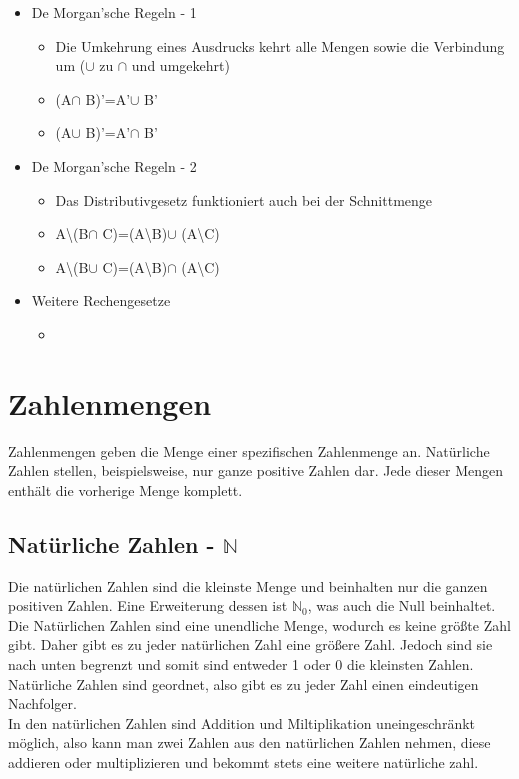 \documentclass{article}
\newcommand{\N}{\mathbb{N}}
\begin{document}
\begin{itemize}
		\item{De Morgan'sche Regeln - 1}
		\begin{itemize}
			\item{Die Umkehrung eines Ausdrucks kehrt alle Mengen sowie die Verbindung um ($\cup$ zu $\cap$ und umgekehrt)}
			\item{(A$\cap$ B)'=A'$\cup$ B'}
			\item{(A$\cup$ B)'=A'$\cap$ B'}
		\end{itemize}
		\item{De Morgan'sche Regeln - 2}
		\begin{itemize}
			\item{Das Distributivgesetz funktioniert auch bei der Schnittmenge}
			\item{A\textbackslash (B$\cap$ C)=(A\textbackslash B)$\cup$ (A\textbackslash C)}
			\item{A\textbackslash (B$\cup$ C)=(A\textbackslash B)$\cap$ (A\textbackslash C)}
		\end{itemize}
		\item{Weitere Rechengesetze}
		\begin{itemize}
			\item{}
		\end{itemize}
	\end{itemize}
	\section{Zahlenmengen}
	Zahlenmengen geben die Menge einer spezifischen Zahlenmenge an. Natürliche Zahlen stellen, beispielsweise, nur ganze positive Zahlen dar. Jede dieser Mengen enthält die vorherige Menge komplett.
	\subsection{Natürliche Zahlen - \texorpdfstring{$\N$}{}}
	Die natürlichen Zahlen sind die kleinste Menge und beinhalten nur die ganzen positiven Zahlen. Eine Erweiterung dessen ist $\N_0$, was auch die Null beinhaltet. Die Natürlichen Zahlen sind eine unendliche Menge, wodurch es keine größte Zahl gibt. Daher gibt es zu jeder natürlichen Zahl eine größere Zahl. Jedoch sind sie nach unten begrenzt und somit sind entweder 1 oder 0 die kleinsten Zahlen. Natürliche Zahlen sind geordnet, also gibt es zu jeder Zahl einen eindeutigen Nachfolger. \\
	In den natürlichen Zahlen sind Addition und Miltiplikation uneingeschränkt möglich, also kann man zwei Zahlen aus den natürlichen Zahlen nehmen, diese addieren oder multiplizieren und bekommt stets eine weitere natürliche zahl.
\end{document}
